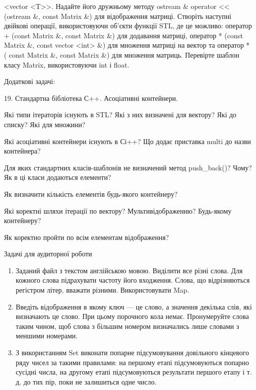 \documentclass[]{article}
\makeatletter
\newcommand{\xslalph}[1]{\expandafter\@xslalph\csname c@#1\endcsname}
\newcommand{\@xslalph}[1]{%
    \ifcase#1\or а\or б\or в\or г\or д\or e\or є\or ж\or з\or i%
    \or й\or к\or л\or м\or н\or о\or п\or р\or с\or т%
    \or у\or ф\or х\or ц\or ч\or ш\or ю\or я\or аа\or бб\or вв%
    \else\@ctrerr\fi%
}
\makeatother
\begin{document}
\begin{enumerate}
\begin{enumerate}[label=\xslalph*)]
\begin{enumerate}
\begin{enumerate}[label=\xslalph*)]
\begin{enumerate}
\begin{enumerate}[label=\xslalph*)]
\begin{enumerate}
\begin{enumerate}[label=\xslalph*)]
\begin{enumerate}
  \textless{}vector \textless{}T\textgreater{}\textgreater{}. Надайте
  його дружньому методу ostream \& operator \textless{}\textless{}
  (ostream \&, const Matrix \&) для відображення матриці. Створіть
  наступні двійкові операції, використовуючи об'єкти функції STL, де це
  можливо: оператор + (const Matrix \&, const Matrix \&) для додавання
  матриці, оператор * (const Matrix \&, const vector
  \textless{}int\textgreater{} \&) для множення матриці на вектор та
  оператор * ( const Matrix \&, const Matrix \&) для множення матриць.
  Перевірте шаблон класу Matrix, використовуючи int і float.
\end{enumerate}

Додаткові задачі:

19. Стандартна бібліотека С++. Асоціативні контейнери.

Які типи ітераторів існують в STL? Які з них визначені для вектору? Які
до списку? Які для множини?

Які асоціативні контейнери існують в Сі++? Що додає приставка multi до
назви контейнера?

Для яких стандартних класів-шаблонів не визначений метод push\_back()?
Чому? Як в ці класи додаються елементи?

Як визначити кількість елементів будь-якого контейнеру?

Які коректні шляхи ітерації по вектору? Мультивідображенню? Будь-якому
контейнеру?

Як коректно пройти по всім елементам відображення?

Задачі для аудиторної роботи

\begin{enumerate}
\def\labelenumi{\arabic{enumi})}
\item
  Заданий файл з текстом англійською мовою. Виділити все різні слова.
  Для кожного слова підрахувати частоту його входження. Слова, що
  відрізняються регістром літер, вважати різними. Використовувати Map.
\item
  Введіть відображення в якому ключ --- це слово, а значення декілька
  слів, які визначають це слово. При цьому порочного кола немає.
  Пронумеруйте слова таким чином, щоб слова з більшим номером
  визначались лише словами з меншими номерами.
\item
  З використанням Set виконати попарне підсумовування довільного
  кінцевого ряду чисел за такими правилами: на першому етапі
  підсумовуються попарно сусідні числа, на другому етапі підсумовуються
  результати першого етапу і т. д. до тих пір, поки не залишиться одне
  число.
\end{enumerate}


\end{enumerate}
\end{enumerate}
\end{enumerate}
\end{enumerate}
\end{enumerate}
\end{enumerate}
\end{enumerate}
\end{enumerate}
\end{document}
